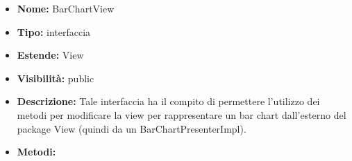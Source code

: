 			
			\begin{itemize}
			\item \textbf{Nome:} BarChartView
			\item \textbf{Tipo:} interfaccia
			
		\item \textbf{Estende:}
		View
			\item \textbf{Visibilità:} public
			\item \textbf{Descrizione:} Tale interfaccia ha il compito di permettere l'utilizzo dei metodi per modificare la view per rappresentare un bar chart dall'esterno del package View (quindi da un BarChartPresenterImpl).
			\item \textbf{Metodi:}
				\begin{itemize}
				\setlength{\itemsep}{5pt}
				

\end{itemize}
\end{itemize}
